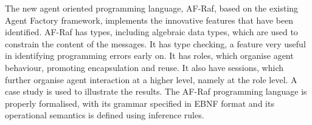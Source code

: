 \documentclass[a4paper,12pt,oneside,fleqn]{book} %
\theoremstyle{plain}
\theoremstyle{definition}
\theoremstyle{remark}
\begin{document}
The new agent oriented programming language, AF-Raf, based on the existing
Agent Factory framework, implements the innovative features that have been
identified. AF-Raf has types, including algebraic data types, which are
used to constrain the content of the messages. It has type checking, a
feature very useful in identifying programming errors early on. It has
roles, which organise agent behaviour, promoting encapsulation and reuse.
It also have sessions, which further organise agent interaction at a higher
level, namely at the role level. A case study is used to illustrate the
results.  The AF-Raf programming language is properly formalised, with its
grammar specified in EBNF format and its operational semantics is defined
using inference rules. 



\appendix
\end{document}
